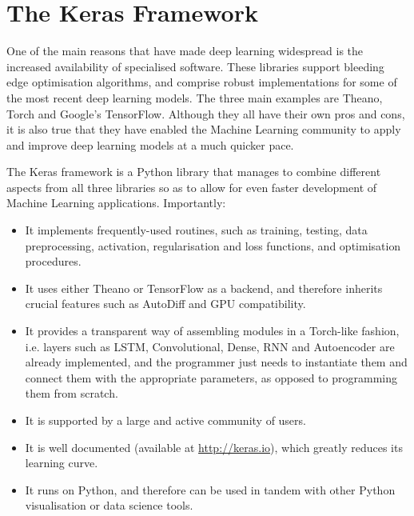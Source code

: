 \documentclass[pdftex,11pt,a4paper]{article}
\theoremstyle{definition}
\theoremstyle{remark}
\begin{document}
\section{The Keras Framework} \label{sec_keras}

One of the main reasons that have made deep learning widespread is the increased availability of specialised software. These libraries support bleeding edge optimisation algorithms, and comprise robust implementations for some of the most recent deep learning models. The three main examples are Theano, Torch and Google's TensorFlow. Although they all have their own pros and cons, it is also true that they have enabled the Machine Learning community to apply and improve deep learning models at a much quicker pace.

\par The Keras framework is a Python library that manages to combine different aspects from all three libraries so as to allow for even faster development of Machine Learning applications. Importantly:

\begin{itemize}
    \item It implements frequently-used routines, such as training, testing, data preprocessing, activation, regularisation and loss functions, and optimisation procedures.
    \item It uses either Theano or TensorFlow as a backend, and therefore inherits crucial features such as AutoDiff and GPU compatibility.
    \item It provides a transparent way of assembling modules in a Torch-like fashion, i.e. layers such as LSTM, Convolutional, Dense, RNN and Autoencoder are already implemented, and the programmer just needs to instantiate them and connect them with the appropriate parameters, as opposed to programming them from scratch.
    \item It is supported by a large and active community of users.
    \item It is well documented (available at \hyperlink{http://keras.io}{http://keras.io}), which greatly reduces its learning curve.
    \item It runs on Python, and therefore can be used in tandem with other Python visualisation or data science tools.
\end{itemize}
\end{document}
